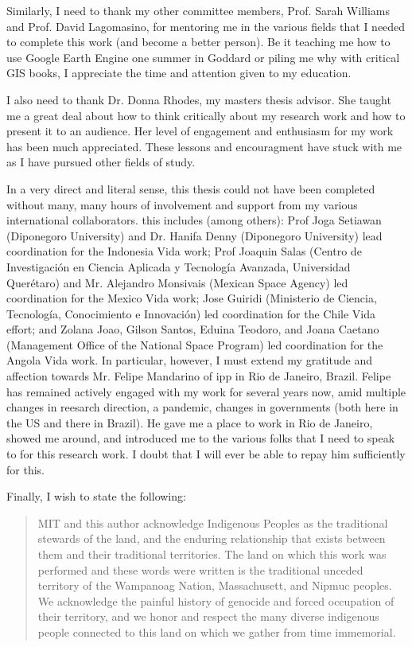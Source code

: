 Similarly, I need to thank my other committee members, Prof. Sarah Williams and Prof. David Lagomasino, for mentoring me in the various fields that I needed to complete this work (and become a better person). Be it teaching me how to use Google Earth Engine one summer in Goddard or piling me why with critical GIS books, I appreciate the time and attention given to my education.

I also need to thank Dr. Donna Rhodes, my masters thesis advisor. She taught me a great deal about how to think critically about my research work and how to present it to an audience. Her level of engagement and enthusiasm for my work has been much appreciated. These lessons and encouragment have stuck with me as I have pursued other fields of study.

In a very direct and literal sense, this thesis could not have been completed without many, many hours of involvement and support from my various international collaborators. this includes (among others): Prof Joga Setiawan (Diponegoro University) and Dr. Hanifa Denny (Diponegoro University) lead coordination for the Indonesia Vida work; Prof Joaquin Salas (Centro de Investigación en Ciencia Aplicada y Tecnología Avanzada, Universidad Querétaro) and Mr. Alejandro Monsivais (Mexican Space Agency) led coordination for the Mexico Vida work; Jose Guiridi (Ministerio de Ciencia, Tecnología, Conocimiento e Innovación) led coordination for the Chile Vida effort; and Zolana Joao, Gilson Santos, Eduina Teodoro, and Joana Caetano (Management Office of the National Space Program) led coordination for the Angola Vida work. In particular, however, I must extend my gratitude and affection towards Mr. Felipe Mandarino of \ac{ipp} in Rio de Janeiro, Brazil. Felipe has remained actively engaged with my work for several years now, amid multiple changes in reesarch direction, a pandemic, changes in governments (both here in the US and there in Brazil). He gave me a place to work in Rio de Janeiro, showed me around, and introduced me to the various folks that I need to speak to for this research work. I doubt that I will ever be able to repay him sufficiently for this.

Finally, I wish to state the following:

\blockquote{MIT and this author acknowledge Indigenous Peoples as the traditional stewards of the land, and the enduring relationship that exists between them and their traditional territories. The land on which this work was performed and these words were written is the traditional unceded territory of the Wampanoag Nation, Massachusett, and Nipmuc peoples. We acknowledge the painful history of genocide and forced occupation of their territory, and we honor and respect the many diverse indigenous people connected to this land on which we gather from time immemorial.}


